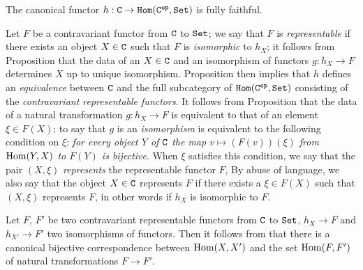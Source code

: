 \begin{proposition}[8.1.7]
\label{0.8.1.7}
The canonical functor $h:\C\to\CHom(\C\op,\Set)$ is fully faithful.
\end{proposition}

\begin{env}[8.1.8]
\label{0.8.1.8}
Let $F$ be a contravariant functor from $\mathtt{C}$ to $\mathtt{Set}$; we say that $F$ is \emph{representable} if there
exists an object $X\in\mathtt{C}$ such that $F$ is \emph{isomorphic} to $h_X$; it follows from
Proposition  that the data of an $X\in\mathtt{C}$ and an isomorphism of functors
$g:h_X\to F$ determines $X$ up to unique isomorphism. Proposition  then
implies that $h$ defines an \emph{equivalence} between $\mathtt{C}$ and the full subcategory of
$\mathtt{Hom}(\mathtt{C}^\mathtt{op},\mathtt{Set})$ consisting of the \emph{contravariant representable functors}. It follows from
Proposition  that the data of a natural transformation $g:h_X\to F$ is
equivalent to that of an element $\xi\in F(X)$; to say that $g$ is an \emph{isomorphism} is
equivalent to the following condition on $\xi$: \emph{for every object $Y$ of $\mathtt{C}$ the map
$v\mapsto(F(v))(\xi)$ from ${\mathop{\mathrm{Hom}}\nolimits}(Y,X)$ to $F(Y)$ is bijective}. When $\xi$ satisfies this condition,
we say that the pair $(X,\xi)$ \emph{represents} the representable functor $F$, By abuse of language,
we also say that the object $X\in\mathtt{C}$ represents $F$ if there exists a $\xi\in F(X)$ such that
$(X,\xi)$ represents $F$, in other words if $h_X$ is isomorphic to $F$.

Let $F$, $F'$ be two contravariant representable functors from $\mathtt{C}$ to $\mathtt{Set}$, $h_X\to F$ and
$h_{X'}\to F'$ two isomorphisms of functors. Then it follows from  that
there is a canonical bijective correspondence between ${\mathop{\mathrm{Hom}}\nolimits}(X,X')$ and the set ${\mathop{\mathrm{Hom}}\nolimits}(F,F')$ of
natural transformations $F\to F'$.
\end{env}

